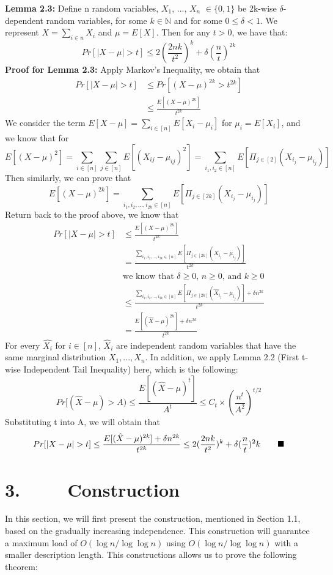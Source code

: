 \documentclass[a4paper, english]{paper}
\begin{document}
	\noindent\textbf{Lemma 2.3:} Define n random variables, $X_1$, ..., $X_n$ $\in \{0, 1\}$ be 2k-wise $\delta$-dependent random variables, for some $k \in \mathbb{N}$ and for some $0 \le \delta < 1$. We represent $X = \sum_{i \in n} X_i$  and $\mu = E[X]$. Then for any $t > 0$, we have that:
	$$ Pr[|X - \mu| > t] \le 2(\frac{2nk}{t^2})^k + \delta(\frac{n}{t})^{2k} $$
	 \noindent\textbf{Proof for Lemma 2.3:} Apply Markov's Inequality, we obtain that
	 \begin{align*}
	 	Pr\left[|X - \mu| > t\right]  &\le Pr\left[\left(X - \mu\right)^{2k} > t^{2k}\right]\\
	 	& \le \frac{E[(X-\mu)^{2k}]}{t^{2k}}
	\end{align*}
	We consider the term $E[X-\mu]=\sum_{i\in[n]} E[X_i - \mu_i]$ for $\mu_i = E[X_i]$, and we know that for 
	$$E[(X-\mu)^2] = \sum_{i \in [n]} \sum_{j \in [n]} E[(X_{ij} - \mu_{ij})^2]=\sum_{i_1, i_2 \in [n]} E[\Pi_{j \in [2]}(X_{i_j}-\mu_{i_j})]$$
	Then similarly, we can prove that 
	$$E[(X-\mu)^{2k}] = \sum_{i_1, i_2, ..., i_{2k} \in [n]} E[\Pi_{j \in [2k]}(X_{i_j}-\mu_{i_j})]$$
	Return back to the proof above, we know that 
	\begin{align*}
	 	Pr\left[|X - \mu| > t\right]  & \le \frac{E[(X-\mu)^{2k}]}{t^{2k}} \\
		&= \frac{\sum_{i_1, i_2, ..., i_{2k} \in [n]} E[\Pi_{j \in [2k]}(X_{i_j}-\mu_{i_j})]}{t^{2k}} \\
		& \text{we know that $\delta \ge 0$, $n \ge 0$, and $k \ge 0$} \\
		& \le \frac{\sum_{i_1, i_2, ..., i_{2k} \in [n]} E[\Pi_{j \in [2k]}(\hat{X}_{i_j}-\mu_{i_j})] + \delta n^{2k}}{t^{2k}} \\
		& = \frac{E[(\hat{X}-\mu)^{2k}] + \delta n^{2k}}{t^{2k}}
	 \end{align*}
	 For every $\hat{X_i}$ for $i \in [n]$, $\hat{X}_i$ are independent random variables that have the same marginal distribution $X_1, ..., X_n$. In addition, we apply Lemma 2.2 (First t-wise Independent Tail Inequality) here, which is the following: 
	 $$ Pr[(\hat{X}-\mu) > A) \le \frac{E[(\hat{X}-\mu)^t]}{A^t} \le C_t \times (\frac{n^t}{A^2})^{t/2} $$ 
	 Substituting t into A, we will obtain that
	 $$ Pr[|X - \mu| > t] \le \frac{E[(\hat{X}-\mu)^{2k}] + \delta n^{2k}}{t^{2k}} \le 2(\frac{2nk}{t^2})^k + \delta (\frac{n}{t})^2k \qquad \hfill\blacksquare$$ 
		
	\section{3. $\qquad$ Construction}
	In this section, we will first present the construction, mentioned in Section 1.1, based on the gradually increasing independence. This construction will guarantee a maximum load of  $O(\log n/\log\log n)$ using $O(\log n/\log\log n)$ with a smaller description length. This constructions allows us to prove the following theorem: \\
	
\end{document}
